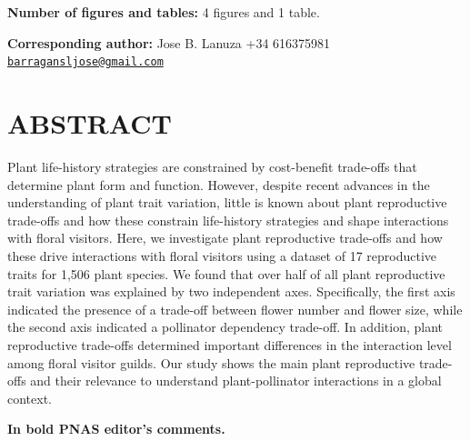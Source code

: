 \documentclass[
  12pt,
  a4paper,
]{article}
\begin{document}
\textbf{Number of figures and tables:} 4 figures and 1 table.

\textbf{Corresponding author:} Jose B. Lanuza \textbar{} +34 616375981\textbar{} \href{mailto:barragansljose@gmail.com}{\nolinkurl{barragansljose@gmail.com}}

\newpage

\hypertarget{abstract}{%
\section{ABSTRACT}\label{abstract}}

Plant life-history strategies are constrained by cost-benefit trade-offs that determine plant form and function. However, despite recent advances in the understanding of plant trait variation, little is known about plant reproductive trade-offs and how these constrain life-history strategies and shape interactions with floral visitors. Here, we investigate plant reproductive trade-offs and how these drive interactions with floral visitors using a dataset of 17 reproductive traits for 1,506 plant species. We found that over half of all plant reproductive trait variation was explained by two independent axes. Specifically, the first axis indicated the presence of a trade-off between flower number and flower size, while the second axis indicated a pollinator dependency trade-off. In addition, plant reproductive trade-offs determined important differences in the interaction level among floral visitor guilds. Our study shows the main plant reproductive trade-offs and their relevance to understand plant-pollinator interactions in a global context.

\newpage

\doublespacing
\vspace{5mm}
\normalsize

\textbf{In bold PNAS editor's comments.}
\end{document}
